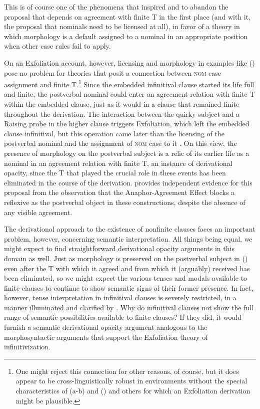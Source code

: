 \documentclass[output=paper]{langscibook}
\begin{document}
\noindent This is of course one of the phenomena that inspired \citet{Yip1987a} and \citet{Marantz1991} to abandon the proposal that \noindent \Nom{} depends on agreement with finite T in the first place (and with it, the proposal that nominals need to be licensed at all), in favor of a theory in which \noindent \Nom{} morphology is a default assigned to a nominal in an appropriate position when other case rules fail to apply. 

On an Exfoliation account, however, licensing and \noindent \Nom{} morphology in examples like \noindent () pose no problem for theories that posit a connection between \textsc{nom }case assignment and finite T.\footnote{One might reject this connection for other reasons, of course, but it does appear to be cross-linguistically robust in environments without the special characteristics of (a-b) and () and others for which an Exfoliation derivation might be plausible. } Since the embedded infinitival clause started its life full and finite, the postverbal nominal could enter an agreement relation with finite T within the embedded clause, just as it would in a clause that remained finite throughout the derivation. The interaction between the quirky subject and a Raising probe in the higher clause triggers Exfoliation, which left the embedded clause infinitival, but this operation came later than the licensing of the postverbal nominal and the assignment of \textsc{nom }case to it . On this view, the presence of \noindent \Nom{} morphology on the postverbal subject is a relic of its earlier life as a nominal in an agreement relation with finite T, an instance of derivational opacity, since the T that played the crucial role in these events has been eliminated in the course of the derivation. \citet{Pesetsky:2019aa} provides independent evidence for this proposal from the observation that the Anaphor-Agreement Effect blocks a reflexive as the postverbal object in these constructions, despite the absence of any visible agreement.

The derivational approach to the existence of nonfinite clauses faces an important problem, however, concerning semantic interpretation. All things being equal, we might expect to find straightforward derivational opacity arguments in this domain as well. Just as \Nom{} morphology is preserved on the postverbal subject in () even after the T with which it agreed and from which it (arguably) received \Nom{} has been eliminated, so we might expect the various tenses and modals available to finite clauses to continue to show semantic signs of their former presence. In fact, however, tense interpretation in infinitival clauses is severely restricted, in a manner illuminated and clarified by \citet{Wurmbrand:2014aa}. Why do infinitival clauses not show the full range of semantic possibilities available to finite clauses? If they did, it would furnish a semantic derivational opacity argument analogous to the morphosyntactic arguments that support the Exfoliation theory of infinitivization.
\end{document}
